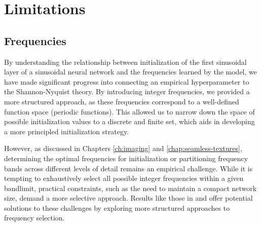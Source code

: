 \section{Limitations}

\subsection{Frequencies}

By understanding the relationship between initialization of the first sinusoidal layer of a sinusoidal neural network and the frequencies learned by the model, we have made significant progress into connecting an empirical hyperparameter to the Shannon-Nyquist theory. By introducing integer frequencies, we provided a more structured approach, as these frequencies correspond to a well-defined function space (periodic functions). This allowed us to narrow down the space of possible initialization values to a discrete and finite set, which aids in developing a more principled initialization strategy.


However, as discussed in Chapters \ref{ch:imaging} and \ref{chap:seamless-textures}, determining the optimal frequencies for initialization or partitioning frequency bands across different levels of detail remains an empirical challenge. While it is tempting to exhaustively select all possible integer frequencies within a given bandlimit, practical constraints, such as the need to maintain a compact network size, demand a more selective approach. Results like those in \cite{novello2022understanding} and \cite{tamingFactory} offer potential solutions to these challenges by exploring more structured approaches to frequency selection.

